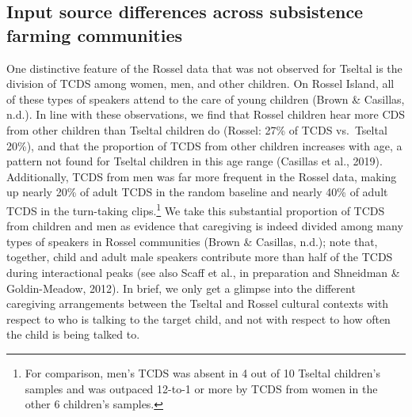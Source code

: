 \documentclass[
  english,
  ,man,floatsintext]{apa6}
\begin{document}
\hypertarget{input-source-differences-across-subsistence-farming-communities}{%
\subsection{Input source differences across subsistence farming communities}\label{input-source-differences-across-subsistence-farming-communities}}

One distinctive feature of the Rossel data that was not observed for Tseltal is the division of TCDS among women, men, and other children. On Rossel Island, all of these types of speakers attend to the care of young children (Brown \& Casillas, n.d.). In line with these observations, we find that Rossel children hear more CDS from other children than Tseltal children do (Rossel: 27\% of TCDS vs.~Tseltal 20\%), and that the proportion of TCDS from other children increases with age, a pattern not found for Tseltal children in this age range (Casillas et al., 2019). Additionally, TCDS from men was far more frequent in the Rossel data, making up nearly 20\% of adult TCDS in the random baseline and nearly 40\% of adult TCDS in the turn-taking clips.\footnote{For comparison, men's TCDS was absent in 4 out of 10 Tseltal children's samples and was outpaced 12-to-1 or more by TCDS from women in the other 6 children's samples.} We take this substantial proportion of TCDS from children and men as evidence that caregiving is indeed divided among many types of speakers in Rossel communities (Brown \& Casillas, n.d.); note that, together, child and adult male speakers contribute more than half of the TCDS during interactional peaks (see also Scaff et al., in preparation and Shneidman \& Goldin-Meadow, 2012). In brief, we only get a glimpse into the different caregiving arrangements between the Tseltal and Rossel cultural contexts with respect to who is talking to the target child, and not with respect to how often the child is being talked to.
\end{document}
